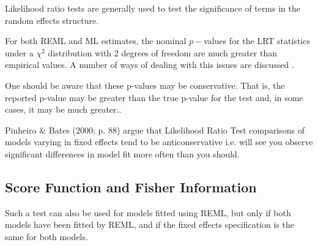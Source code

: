 \documentclass[12pt, a4paper]{article}
\begin{document}
	Likelihood ratio tests are generally used to test the significance of terms in the random effects structure.
	
	
	
	
	
	
	For both REML and ML estimates, the nominal $p-$values for the LRT statistics under a $\chi^2$ distribution with 2 degrees of freedom are much greater than empirical values. A number of ways of dealing with this issues are discussed \citep[pg.86]{pb}.
	
	One should be aware that these p-values may be conservative. That is, the reported p-value may be greater than the true p-value for the test and, in some cases, it may be much greater.\citep[pg.87]{pb}.
	
	
	
	Pinheiro \& Bates (2000; p. 88) argue that Likelihood Ratio Test comparisons of models varying in fixed effects tend to be anticonservative i.e. 
	will see you observe significant differences in model fit more often than you should. 
	
	
	
\subsection{Score Function and Fisher Information}
	
Such a test can also be used for models fitted using REML, but only if both models have been fitted by REML, and if the fixed effects specification is the same for both models.
	
\end{document}
